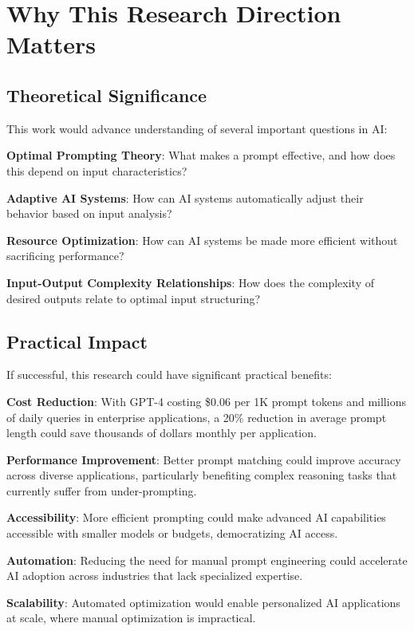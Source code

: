 \documentclass[11pt,a4paper]{article}
\begin{document}
\section{Why This Research Direction Matters}

\subsection{Theoretical Significance}

This work would advance understanding of several important questions in AI:

\textbf{Optimal Prompting Theory}: What makes a prompt effective, and how does this depend on input characteristics?

\textbf{Adaptive AI Systems}: How can AI systems automatically adjust their behavior based on input analysis?

\textbf{Resource Optimization}: How can AI systems be made more efficient without sacrificing performance?

\textbf{Input-Output Complexity Relationships}: How does the complexity of desired outputs relate to optimal input structuring?

\subsection{Practical Impact}

If successful, this research could have significant practical benefits:

\textbf{Cost Reduction}: With GPT-4 costing \$0.06 per 1K prompt tokens and millions of daily queries in enterprise applications, a 20\% reduction in average prompt length could save thousands of dollars monthly per application.

\textbf{Performance Improvement}: Better prompt matching could improve accuracy across diverse applications, particularly benefiting complex reasoning tasks that currently suffer from under-prompting.

\textbf{Accessibility}: More efficient prompting could make advanced AI capabilities accessible with smaller models or budgets, democratizing AI access.

\textbf{Automation}: Reducing the need for manual prompt engineering could accelerate AI adoption across industries that lack specialized expertise.

\textbf{Scalability}: Automated optimization would enable personalized AI applications at scale, where manual optimization is impractical.
\end{document}

